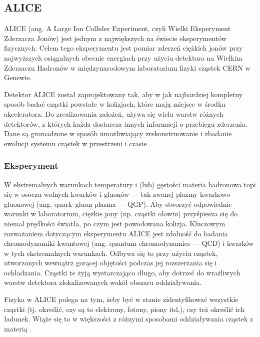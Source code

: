 \newpage
\subsection{ALICE}
ALICE (ang. A Large Ion Collider Experiment, czyli Wielki Eksperyment Zderzacza Jonów) jest jednym z największych na świecie eksperymentów fizycznych. Celem tego eksperymentu jest pomiar zderzeń ciężkich jonów przy najwyższych osiągalnych obecnie energiach przy użyciu detektora na Wielkim Zderzaczu Hadronów w międzynarodowym laboratorium fizyki cząstek CERN w Genewie. 

Detektor ALICE został zaprojektowany tak, aby w jak najbardziej kompletny sposób badać cząstki powstałe w kolizjach, które mają miejsce w środku akceleratora. Do zrealizowania założeń, używa się wielu warstw różnych detektorów, z których każda dostarcza innych informacji o przebiegu zderzenia. Dane są gromadzone w sposób umożliwiający zrekonstruowanie i zbadanie ewolucji systemu cząstek w przestrzeni i czasie \cite{aliceofficial}. 

\subsubsection{Eksperyment}
W ekstremalnych warunkach temperatury i (lub) gęstości materia hadronowa topi się w osoczu wolnych kwarków i gluonów --- tak zwanej plazmy kwarkowo-gluonowej (ang. quark–gluon plasma --- QGP). Aby stworzyć odpowiednie warunki w laboratorium, ciężkie jony (np. cząstki ołowiu) przyśpiesza się do niemal prędkości światła, po czym jest powodowana kolizja. Kluczowym rozważaniem dotyczącym eksperymentu ALICE jest zdolność do badania chromodynamiki kwantowej (ang.  quantum chromodynamics --- QCD) i kwarków w tych ekstremalnych warunkach. Odbywa się to przy użyciu cząstek, utworzonych wewnątrz gorącej objętości podczas jej rozszerzania się i ochładzania. Cząstki te żyją wystarczająco długo, aby dotrzeć do wrażliwych warstw detektora zlokalizowanych wokół obszaru oddziaływania.

 Fizyka w ALICE polega na tym, żeby być w stanie zidentyfikować wszystkie cząstki (tj. określić, czy są to elektrony, fotony, piony itd.), czy też określić ich ładunek. Wiąże się to w większości z różnymi sposobami oddziaływania cząstek z materią \cite{aliceexperiment}.

